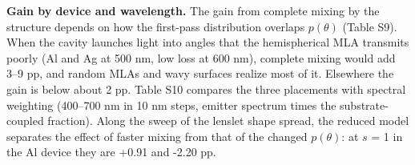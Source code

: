 \documentclass[10pt]{article}
\begin{document}
\begin{table}[htbp]
\centering
\footnotesize
\caption*{\textbf{Table S8.} Henyey–Greenstein volumes under a planar exit face (Al device, 550 nm): diffuse reflectance of the bare volume for Lambertian incidence, escape probability $p$ of the volume with its exit face, and $\eta_{\mathrm{sta}}$.}
\end{table}

\textbf{Gain by device and wavelength.} The gain from complete mixing by the structure depends on how the first-pass distribution overlaps $p(\theta)$ (Table S9). When the cavity launches light into angles that the hemispherical MLA transmits poorly (Al and Ag at 500 nm, low loss at 600 nm), complete mixing would add 3–9 pp, and random MLAs and wavy surfaces realize most of it. Elsewhere the gain is below about 2 pp. Table S10 compares the three placements with spectral weighting (400–700 nm in 10 nm steps, emitter spectrum times the substrate-coupled fraction). Along the sweep of the lenslet shape spread, the reduced model separates the effect of faster mixing from that of the changed $p(\theta)$: at $s$ = 1 in the Al device they are +0.91 and -2.20 pp.
\end{document}
